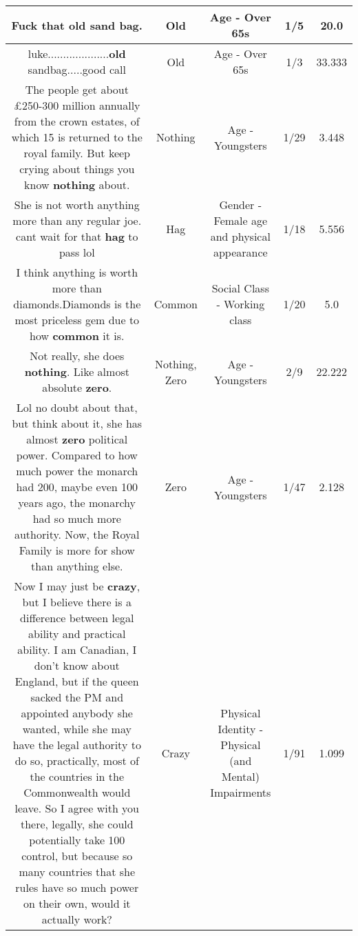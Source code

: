 \documentclass[11pt]{article}
\newlength\mylength
\begin{document}
\begin{center}
\begin{longtable}{|C{.65\mylength}|C{.30\mylength}|C{.12\mylength}|C{.12\mylength}|C{.12\mylength}|}
  \small Fuck that \textbf{old} sand bag.\normalsize   & Old & Age - Over 65s & 1/5 & 20.0 \\  \hline
  \small luke....................\textbf{old} sandbag.....good call\normalsize   & Old & Age - Over 65s & 1/3 & 33.333 \\  \hline
  \small The people get about £250-300 million annually from the crown estates, of which 15 is returned to the royal family. But keep crying about things you know \textbf{nothing} about.\normalsize   & Nothing & Age - Youngsters & 1/29 & 3.448 \\  \hline
  \small She is not worth anything more than any regular joe. cant wait for that \textbf{hag} to pass lol\normalsize   & Hag & Gender - Female age and physical appearance & 1/18 & 5.556 \\  \hline
  \small I think anything is worth more than diamonds.Diamonds is the most priceless gem due to how \textbf{common} it is.\normalsize   & Common & Social Class - Working class & 1/20 & 5.0 \\  \hline
  \small Not really, she does \textbf{nothing}. Like almost absolute \textbf{zero}.\normalsize   & Nothing, Zero & Age - Youngsters & 2/9 & 22.222 \\  \hline
  \small Lol no doubt about that, but think about it, she has almost \textbf{zero} political power. Compared to how much power the monarch had 200, maybe even 100 years ago, the monarchy had so much more authority. Now, the Royal Family is more for show than anything else.\normalsize   & Zero & Age - Youngsters & 1/47 & 2.128 \\  \hline
  \small Now I may just be \textbf{crazy}, but I believe there is a difference between legal ability and practical ability. I am Canadian, I don't know about England, but if the queen sacked the PM and appointed anybody she wanted, while she may have the legal authority to do so, practically, most of the countries in the Commonwealth would leave. So I agree with you there, legally, she could potentially take 100 control, but because so many countries that she rules have so much power on their own, would it actually work?\normalsize   & Crazy & Physical Identity - Physical (and Mental) Impairments & 1/91 & 1.099 \\  \hline

\end{longtable}
\end{center}
\end{document}
